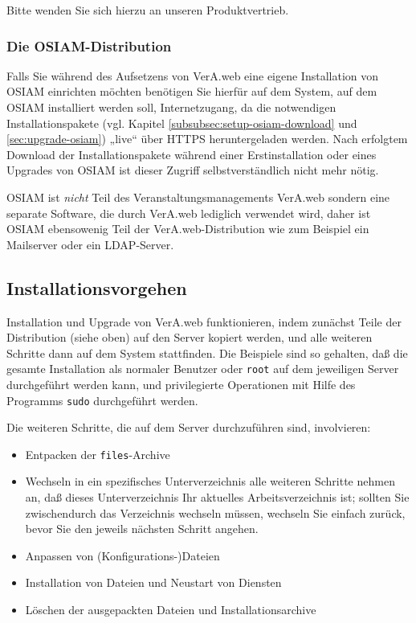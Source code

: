 Bitte wenden Sie sich hierzu an unseren Produktvertrieb.

\ifoa

\subsubsection{Die OSIAM-Distribution}\label{subsubsec:intro-distro-ong}

Falls Sie während des Aufsetzens von VerA.web eine eigene Installation
von OSIAM einrichten möchten benötigen Sie hierfür auf dem System, auf
dem OSIAM installiert werden soll, Internetzugang, da die notwendigen
Installationspakete (vgl. Kapitel
\ref{subsubsec:setup-osiam-download} und
\ref{sec:upgrade-osiam}) „live“ über HTTPS heruntergeladen werden. Nach
erfolgtem Download der Installationspakete während einer Erstinstallation
oder eines Upgrades von OSIAM ist dieser Zugriff selbstverständlich nicht
mehr nötig.

OSIAM ist \emph{nicht} Teil des Veranstaltungsmanagements VerA.web sondern
eine separate Software, die durch VerA.web lediglich verwendet wird, daher
ist OSIAM ebensowenig Teil der VerA.web-Distribution wie zum Beispiel ein
Mailserver oder ein LDAP-Server.

\fi%

\subsection{Installationsvorgehen}\label{subsec:intro-install}

Installation und Upgrade von VerA.web funktionieren, indem
zunächst Teile der Distribution (siehe oben) auf den Server
kopiert werden, und alle weiteren Schritte dann auf dem System
stattfinden. Die Beispiele sind so gehalten, daß die gesamte
Installation als normaler Benutzer oder \texttt{root} auf dem
\ifoa
jeweiligen
\fi%
Server durchgeführt werden kann, und privilegierte Operationen
mit Hilfe des Programms \texttt{sudo} durchgeführt werden.

Die weiteren Schritte, die auf dem Server durchzuführen sind,
involvieren:\keinumbruch

\begin{itemize}
 \item{Entpacken der \texttt{files}-Archive}
 \item{Wechseln in ein spezifisches Unterverzeichnis \dash
  alle weiteren Schritte nehmen an, daß dieses Unterverzeichnis
  Ihr aktuelles Arbeitsverzeichnis ist; sollten Sie zwischendurch
  das Verzeichnis wechseln müssen, wechseln Sie einfach zurück,
  bevor Sie den jeweils nächsten Schritt angehen.}
 \item{Anpassen von (Konfigurations-)Dateien}
 \item{Installation von Dateien und Neustart von Diensten}
 \item{Löschen der ausgepackten Dateien und Installationsarchive}
\end{itemize}

